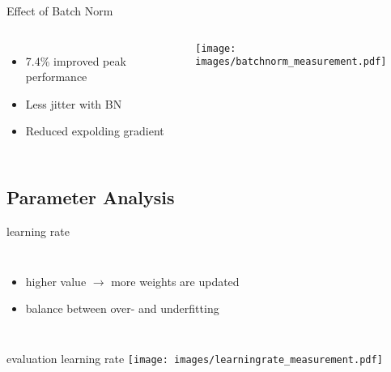 \documentclass[aspectratio=1610, 12pt]{beamer}
\begin{document}
\begin{frame}{Effect of Batch Norm}
	\begin{columns}
		\begin{itemize}
			\item 7.4\% improved peak performance
			\item Less jitter with BN
			\item Reduced expolding gradient
		\end{itemize}

		\centering
		\texttt{[image: images/batchnorm\_measurement.pdf]}
	\end{columns}
\end{frame}


\subsection{Parameter Analysis}
\begin{frame}{learning rate}
	\begin{columns}
		\column{0.49\textwidth}
		\begin{itemize}
			\item higher value $\rightarrow$ more weights are updated
			\item balance between over- and underfitting
		\end{itemize}
		\column{0.49\textwidth}



	\end{columns}

\end{frame}
\begin{frame}{evaluation learning rate}
	\centering
	\vspace*{-1cm}\texttt{[image: images/learningrate\_measurement.pdf]}
\end{frame}
\end{document}
